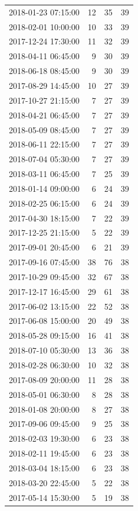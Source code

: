 \begin{tabular}{lrrr}
2018-01-23 07:15:00 & 12 & 35 & 39 \\
2018-02-01 10:00:00 & 10 & 33 & 39 \\
2017-12-24 17:30:00 & 11 & 32 & 39 \\
2018-04-11 06:45:00 & 9 & 30 & 39 \\
2018-06-18 08:45:00 & 9 & 30 & 39 \\
2017-08-29 14:45:00 & 10 & 27 & 39 \\
2017-10-27 21:15:00 & 7 & 27 & 39 \\
2018-04-21 06:45:00 & 7 & 27 & 39 \\
2018-05-09 08:45:00 & 7 & 27 & 39 \\
2018-06-11 22:15:00 & 7 & 27 & 39 \\
2018-07-04 05:30:00 & 7 & 27 & 39 \\
2018-03-11 06:45:00 & 7 & 25 & 39 \\
2018-01-14 09:00:00 & 6 & 24 & 39 \\
2018-02-25 06:15:00 & 6 & 24 & 39 \\
2017-04-30 18:15:00 & 7 & 22 & 39 \\
2017-12-25 21:15:00 & 5 & 22 & 39 \\
2017-09-01 20:45:00 & 6 & 21 & 39 \\
2017-09-16 07:45:00 & 38 & 76 & 38 \\
2017-10-29 09:45:00 & 32 & 67 & 38 \\
2017-12-17 16:45:00 & 29 & 61 & 38 \\
2017-06-02 13:15:00 & 22 & 52 & 38 \\
2017-06-08 15:00:00 & 20 & 49 & 38 \\
2018-05-28 09:15:00 & 16 & 41 & 38 \\
2018-07-10 05:30:00 & 13 & 36 & 38 \\
2018-02-28 06:30:00 & 10 & 32 & 38 \\
2017-08-09 20:00:00 & 11 & 28 & 38 \\
2018-05-01 06:30:00 & 8 & 28 & 38 \\
2018-01-08 20:00:00 & 8 & 27 & 38 \\
2017-09-06 09:45:00 & 9 & 25 & 38 \\
2018-02-03 19:30:00 & 6 & 23 & 38 \\
2018-02-11 19:45:00 & 6 & 23 & 38 \\
2018-03-04 18:15:00 & 6 & 23 & 38 \\
2018-03-20 22:45:00 & 5 & 22 & 38 \\
2017-05-14 15:30:00 & 5 & 19 & 38 \\

\end{tabular}
